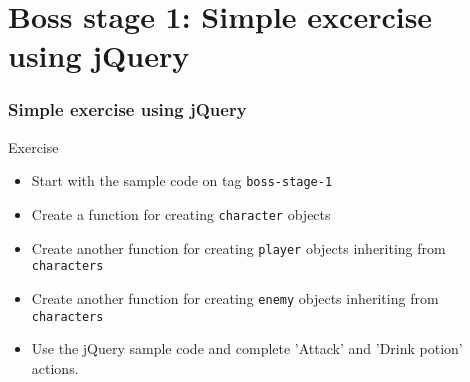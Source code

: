 \section{Boss stage 1: Simple excercise using jQuery}

\begin{frame}[fragile]
\end{frame}

\begin{frame}[fragile]
  \frametitle{Simple exercise using jQuery}
  \begin{block}{Exercise}
    \begin{itemize}
      \item Start with the sample code on tag \texttt{boss-stage-1}
      \item Create a function for creating \texttt{character} objects
      \item Create another function for creating \texttt{player} objects inheriting from \texttt{characters}
      \item Create another function for creating \texttt{enemy} objects inheriting from \texttt{characters}
      \item Use the jQuery sample code and complete 'Attack' and 'Drink potion' actions.
    \end{itemize}
  \end{block}
\end{frame}
